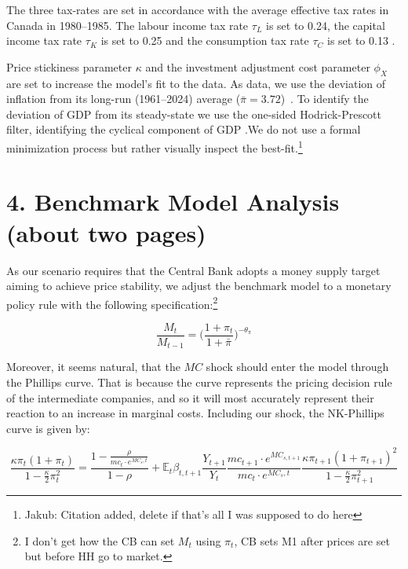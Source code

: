 \documentclass[12pt]{article}
\begin{document}
The three tax-rates are set in accordance with the average effective tax rates in Canada in 1980--1985. The labour income tax rate $\tau_L$ is set to 0.24, the capital income tax rate $\tau_K$ is set to 0.25 and the consumption tax rate $\tau_C$ is set to 0.13
\parencite{careyAverageEffectiveTax2000}. 

Price stickiness parameter $\kappa$ and the investment adjustment cost parameter $\phi_X$ are set to increase the model's fit to the data. As data, we use the deviation of inflation from its long-run (1961--2024) average ($\bar{\pi} =  3.72$)~\parencite{worldbank_inflation_ca}. To identify the deviation of GDP from its steady-state we use the one-sided Hodrick-Prescott filter, identifying the cyclical component of GDP \parencite{fred_gdp_per_capita_ca}.\@ We do not use a formal minimization process but rather visually inspect the best-fit.\footnote{Jakub: Citation added, delete if that's all I was supposed to do here}


\newpage
\section*{4. Benchmark Model Analysis (about two pages)}

As our scenario requires that the Central Bank adopts a money supply target aiming to achieve price stability, we adjust the benchmark model to a monetary policy rule with the following specification:\footnote{I don't get how the CB can set $M_t$ using $\pi_t$, CB sets M1 after prices are set but before HH go to market.}

\begin{equation}
    \frac{M_t}{M_{t-1}} = \Big(\frac{1+\pi_{t}}{1+ \bar \pi}\Big)^{-\theta_{\pi}}
\end{equation}

Moreover, it seems  natural, that the $MC$ shock should enter the model through the Phillips curve. That is because the curve represents the pricing decision rule of the intermediate companies, and so it will most accurately represent their reaction to an increase in marginal costs. Including our shock, the NK-Phillips curve is given by: 

\begin{equation}
    \frac{\kappa \pi_t (1 + \pi_t)}{1 - \frac{\kappa}{2} \pi_t^2}
    = \frac{1 - \frac{\rho}{mc_t \cdot e^{MC_s,t}}}{1 - \rho}
    + \mathbb{E}_t \beta_{t,t+1}
    \frac{Y_{t+1}}{Y_t}
    \frac{mc_{t+1} \cdot e^{MC_{s,t+1}}}{mc_t \cdot e^{MC_s,t}}
    \frac{\kappa \pi_{t+1} (1 + \pi_{t+1})^{2}}{1 - \frac{\kappa}{2} \pi_{t+1}^2}
\end{equation}
\end{document}
